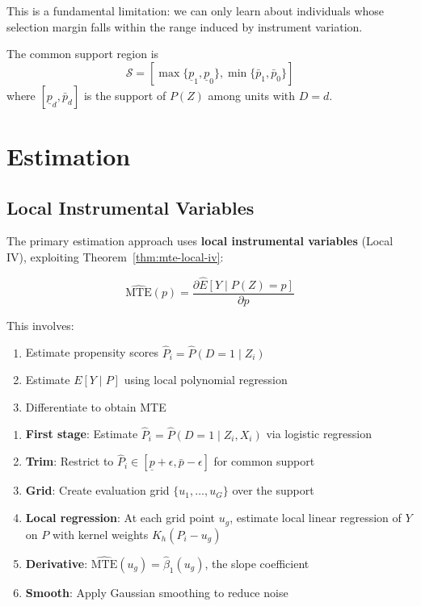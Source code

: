 This is a fundamental limitation: we can only learn about individuals whose selection margin falls within the range induced by instrument variation.

\begin{definition}
\label{def:common-support}
The common support region is
\begin{equation}
\mathcal{S} = [\max\{\underline{p}_1, \underline{p}_0\}, \min\{\bar{p}_1, \bar{p}_0\}]
\end{equation}
where $[\underline{p}_d, \bar{p}_d]$ is the support of $P(Z)$ among units with $D = d$.
\end{definition}

\section{Estimation}
\label{sec:mte-estimation}

\subsection{Local Instrumental Variables}

The primary estimation approach uses \textbf{local instrumental variables} (Local IV), exploiting Theorem~\ref{thm:mte-local-iv}:

\begin{equation}
\widehat{\text{MTE}}(p) = \frac{\partial \hat{E}[Y \mid P(Z) = p]}{\partial p}
\end{equation}

This involves:
\begin{enumerate}
\item Estimate propensity scores $\hat{P}_i = \hat{P}(D=1 \mid Z_i)$
\item Estimate $E[Y \mid P]$ using local polynomial regression
\item Differentiate to obtain MTE
\end{enumerate}

\begin{algorithm}
\label{alg:local-iv}
\begin{enumerate}
\item \textbf{First stage}: Estimate $\hat{P}_i = \hat{P}(D=1 \mid Z_i, X_i)$ via logistic regression
\item \textbf{Trim}: Restrict to $\hat{P}_i \in [\underline{p} + \epsilon, \bar{p} - \epsilon]$ for common support
\item \textbf{Grid}: Create evaluation grid $\{u_1, \ldots, u_G\}$ over the support
\item \textbf{Local regression}: At each grid point $u_g$, estimate local linear regression of $Y$ on $P$ with kernel weights $K_h(P_i - u_g)$
\item \textbf{Derivative}: $\widehat{\text{MTE}}(u_g) = \hat{\beta}_1(u_g)$, the slope coefficient
\item \textbf{Smooth}: Apply Gaussian smoothing to reduce noise
\end{enumerate}
\end{algorithm}

